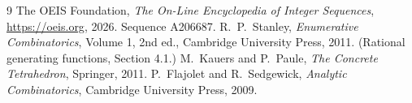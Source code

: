 \documentclass[11pt,a4paper]{article}
\theoremstyle{plain}
\theoremstyle{definition}
\begin{document}
\begin{thebibliography}{9}
 The OEIS Foundation, \emph{The On-Line Encyclopedia of Integer
Sequences}, \url{https://oeis.org}, 2026. Sequence A206687.
 R.~P.~Stanley, \emph{Enumerative Combinatorics}, Volume 1, 2nd ed.,
Cambridge University Press, 2011. (Rational generating functions, Section 4.1.)
 M.~Kauers and P.~Paule, \emph{The Concrete Tetrahedron}, Springer, 2011.
 P.~Flajolet and R.~Sedgewick, \emph{Analytic Combinatorics}, Cambridge
University Press, 2009.
\end{thebibliography}
\end{document}
